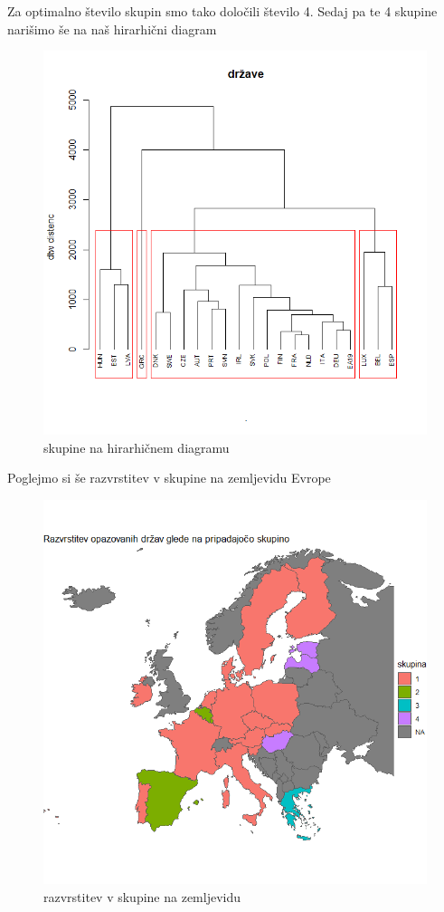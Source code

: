\documentclass[12pt,a4paper]{article}
\begin{document}
Za optimalno število skupin  smo tako določili število 4. Sedaj pa te 4 skupine 
narišimo še na naš hirarhični diagram\\
\begin{figure}[h!]
    \centering
    \includegraphics[scale=0.43]{slike/skupine.png}
    \caption{skupine na hirarhičnem diagramu}
\end{figure}

\pagebreak
Poglejmo si še razvrstitev v skupine na zemljevidu Evrope 
\begin{figure}[h!]
    \centering
    \includegraphics[scale=0.40]{slike/zemljevid.png}
    \caption{razvrstitev v skupine na zemljevidu}
\end{figure}
\end{document}

